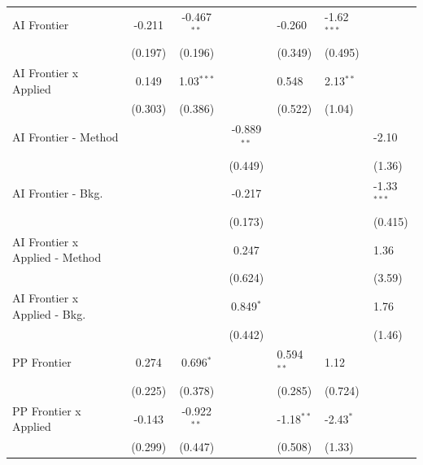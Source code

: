 \begin{tabular}{lccc}
   AI Frontier                    & -0.211       & -0.467$^{**}$ &               & -0.260       & -1.62$^{***}$ &   \\   
                                  & (0.197)      & (0.196)       &               & (0.349)      & (0.495)       &   \\   
   AI Frontier x Applied          & 0.149        & 1.03$^{***}$  &               & 0.548        & 2.13$^{**}$   &   \\   
                                  & (0.303)      & (0.386)       &               & (0.522)      & (1.04)        &   \\   
   AI Frontier - Method           &              &               & -0.889$^{**}$ &              &               & -2.10\\   
                                  &              &               & (0.449)       &              &               & (1.36)\\   
   AI Frontier - Bkg.             &              &               & -0.217        &              &               & -1.33$^{***}$\\   
                                  &              &               & (0.173)       &              &               & (0.415)\\   
   AI Frontier x Applied - Method &              &               & 0.247         &              &               & 1.36\\   
                                  &              &               & (0.624)       &              &               & (3.59)\\   
   AI Frontier x Applied - Bkg.   &              &               & 0.849$^{*}$   &              &               & 1.76\\   
                                  &              &               & (0.442)       &              &               & (1.46)\\   
   PP Frontier                    & 0.274        & 0.696$^{*}$   &               & 0.594$^{**}$ & 1.12          &   \\   
                                  & (0.225)      & (0.378)       &               & (0.285)      & (0.724)       &   \\   
   PP Frontier x Applied          & -0.143       & -0.922$^{**}$ &               & -1.18$^{**}$ & -2.43$^{*}$   &   \\   
                                  & (0.299)      & (0.447)       &               & (0.508)      & (1.33)        &   \\   

\end{tabular}
